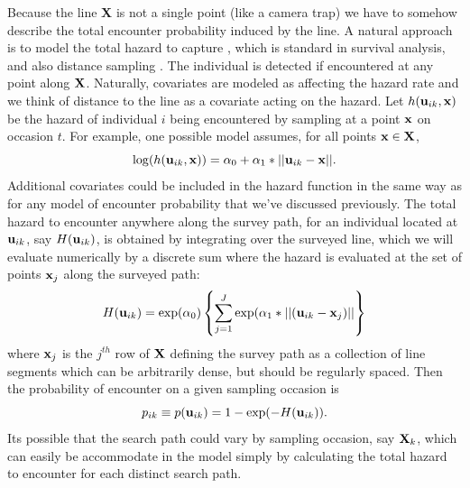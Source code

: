 Because the line {\bf X} is not a single point (like a camera trap) we
have to somehow describe the total encounter probability induced by
the line. A natural approach is to model the total hazard to capture
\citep{borchers_efford:2008}, which is standard in survival analysis,
and also distance sampling \citep{hayes_buckland:1983,
  skaug_schweder:1999}.  The individual is detected if encountered at
any point along ${\bf X}$. Naturally, covariates are modeled as
affecting the hazard rate and we think of distance to the line as a
covariate acting on the hazard. Let $h({\bf u}_{ik},{\bf x})$ be the
hazard of individual $i$ being encountered by sampling at a point
${\bf x}$ on occasion $t$.  For example, one possible model assumes,
for all points ${\bf x} \in {\bf X}$,
\begin{equation}
\log(h({\bf u}_{ik},{\bf x})) = \alpha_{0} + \alpha_{1}*||{\bf u}_{ik}-{\bf x}||.
\label{eq.hazard}
\end{equation}
Additional covariates could be included in the hazard function in the
same way as for any model of encounter probability that we've
discussed previously.  The total hazard to encounter anywhere along
the survey path, for an individual located at ${\bf u}_{ik}$, say
$H({\bf u}_{ik})$, is obtained by integrating over the surveyed line,
which we will evaluate numerically by a discrete sum where the hazard
is evaluated at the set of points ${\bf x}_{j}$ along the surveyed
path:
\begin{equation}
H({\bf u}_{ik}) =  \exp(\alpha_{0}) \left\{ \sum_{j=1}^{J}  \exp(\alpha_{1}*||({\bf
    u}_{ik} - {\bf x}_{j})|| \right\}
\label{eq.totalhazard}
\end{equation}
where ${\bf x}_{j}$ is the $j^{th}$ row of ${\bf X}$ defining the
survey path as a collection of line segments which can be arbitrarily
dense, but should be regularly spaced.  Then the probability of
encounter on a given sampling occasion  is
\begin{equation}
p_{ik} \equiv p({\bf u}_{ik}) = 1- \exp(-H({\bf u}_{ik})).
\label{search-encounter.eq.encounterprob}
\end{equation}
Its possible that the search path could vary by sampling occasion, say
${\bf X}_{k}$, which can easily be accommodate in the model simply by
calculating the total hazard to encounter for each distinct search
path.

